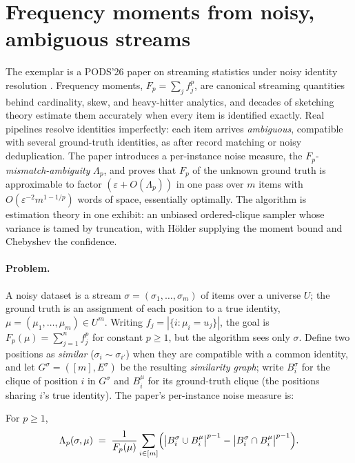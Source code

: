\section{Frequency moments from noisy, ambiguous streams}
\label{sec:est-fp}

The exemplar is a PODS'26 paper on streaming statistics under noisy identity resolution
\citep{sigmod26-115}\pods. Frequency moments, $F_p = \sum_j f_j^p$, are canonical streaming
quantities behind cardinality, skew, and heavy-hitter analytics, and decades of sketching theory
estimate them accurately when every item is identified exactly. Real pipelines resolve
identities imperfectly: each item arrives \emph{ambiguous}, compatible with several
ground-truth identities, as after record matching or noisy deduplication. The paper
introduces a per-instance noise measure, the $F_p$-\emph{mismatch-ambiguity} $\Lambda_p$,
and proves that $F_p$ of the unknown ground
truth is approximable to factor $(\varepsilon + O(\Lambda_p))$ in one pass over $m$ items with
$O(\varepsilon^{-2} m^{1-1/p})$ words of space, essentially optimally. The algorithm is
estimation theory in one exhibit: an unbiased ordered-clique sampler whose variance is tamed by
truncation, with H\"older supplying the moment bound and Chebyshev the confidence.

\paragraph{Problem.}
A noisy dataset is a stream $\sigma = (\sigma_1,\dots,\sigma_m)$ of items over a universe $U$;
the ground truth is an assignment of each position to a true identity, $\mu = (\mu_1,\dots,
\mu_m) \in U^m$. Writing $f_j = |\{i : \mu_i = u_j\}|$, the goal is $F_p(\mu) = \sum_{j=1}^n
f_j^p$ for constant $p \ge 1$, but the algorithm sees only $\sigma$. Define two positions as
\emph{similar} ($\sigma_i \sim \sigma_{i'}$) when they are compatible with a common identity, and
let $G^\sigma = ([m], E^\sigma)$ be the resulting \emph{similarity graph}; write $B_i^\sigma$ for
the clique of position $i$ in $G^\sigma$ and $B_i^\mu$ for its ground-truth clique (the positions
sharing $i$'s true identity). The paper's per-instance noise measure is:

\begin{definition}
\label{def:est-fp-lambda}
For $p \ge 1$,
\[
\Lambda_p(\sigma,\mu) \;=\; \frac{1}{F_p(\mu)} \sum_{i\in[m]}
\Bigl(\bigl|B_i^\sigma \cup B_i^\mu\bigr|^{p-1} -
\bigl|B_i^\sigma \cap B_i^\mu\bigr|^{p-1}\Bigr).
\]
\end{definition}

